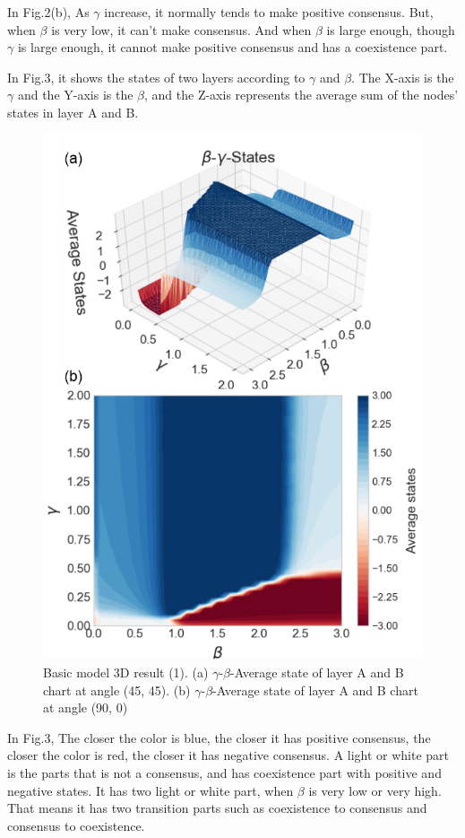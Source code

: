 \documentclass[english]{cccconf}
\begin{document}
In Fig.2(b), As $\gamma$ increase, it normally tends to make positive consensus. But, when $\beta$ is very low, it can’t make consensus. And when $\beta$ is large enough, though $\gamma$ is large enough, it cannot make positive consensus and has a coexistence part.

In Fig.3, it shows the states of two layers according to $\gamma$ and $\beta$. The X-axis is the $\gamma$ and the Y-axis is the $\beta$, and the Z-axis represents the average sum of the nodes' states in layer A and B.

\begin{figure}[!htb]
  \centering
  \includegraphics[width=\hsize]{FIG3.png}
  \caption{Basic model 3D result (1). (a) $\gamma$-$\beta$-Average state of layer A and B chart at angle (45, 45). (b) $\gamma$-$\beta$-Average state of layer A and B chart at angle (90, 0)}
  \label{Fig3}
\end{figure}
In Fig.3, The closer the color is blue, the closer it has positive consensus, the closer the color is red, the closer it has negative consensus. A light or white part is the parts that is not a consensus, and has coexistence part with positive and negative states. It has two light or white part, when $\beta$ is very low or very high. That means it has two transition parts such as coexistence to consensus and consensus to coexistence.
\end{document}
